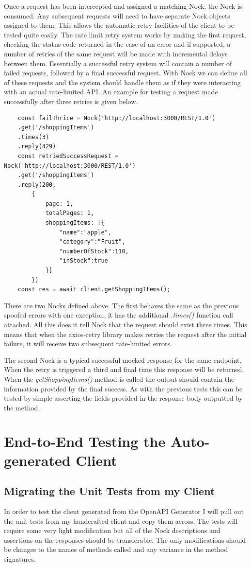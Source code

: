 Once a request has been intercepted and assigned a matching Nock, the Nock is consumed. Any subsequent requests will need to have separate Nock objects assigned to them. This allows the automatic retry facilities of the client to be tested quite easily. The rate limit retry system works by making the first request, checking the status code returned in the case of an error and if supported, a number of retries of the same request will be made with incremental delays between them. Essentially a successful retry system will contain a number of failed requests, followed by a final successful request. With Nock we can define all of these requests and the system should handle them as if they were interacting with an actual rate-limited API. An example for testing a request made successfully after three retries is given below.
\begin{verbatim}
    const failThrice = Nock('http://localhost:3000/REST/1.0')
    .get('/shoppingItems')
    .times(3)
    .reply(429)
    const retriedSuccessRequest = Nock('http://localhost:3000/REST/1.0')
    .get('/shoppingItems') 
    .reply(200,
        {
            page: 1,
            totalPages: 1,
            shoppingItems: [{
                "name":"apple",
                "category":"Fruit",
                "numberOfStock":110,
                "inStock":true
            }]
        })
    const res = await client.getShoppingItems();
\end{verbatim}
There are two Nocks defined above. The first behaves the same as the previous spoofed errors with one exception, it has the additional \textit{.times()} function call attached. All this does it tell Nock that the request should exist three times. This means that when the axios-retry library makes retries the request after the initial failure, it will receive two subsequent rate-limited errors. 

The second Nock is a typical successful mocked response for the same endpoint. When the retry is triggered a third and final time this response will be returned. When the \textit{getShoppingItems()} method is called the output should contain the information provided by the final success. As with the previous tests this can be tested by simple asserting the fields provided in the response body outputted by the method.
\section{End-to-End Testing the Auto-generated Client}
\subsection{Migrating the Unit Tests from my Client}
In order to test the client generated from the OpenAPI Generator I will pull out the unit tests from my handcrafted client and copy them across. The tests will require some very light modification but all of the Nock descriptions and assertions on the responses should be transferable. The only modifications should be changes to the names of methods called and any variance in the method signatures.

